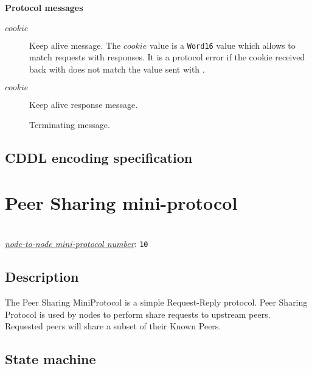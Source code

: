 \paragraph{Protocol messages}
\begin{description}
\item [\MsgKeepAlive{} $cookie$]
  Keep alive message.  The $cookie$ value is a \texttt{Word16} value which allows to
  match requests with responses.  It is a protocol error if the cookie received
  back with \MsgKeepAliveResponse{} does not match the value sent with
  \MsgKeepAlive{}.
\item [\MsgKeepAliveResponse{} $cookie$]
  Keep alive response message.
\item [\MsgDone]
  Terminating message.
\end{description}

\subsection{CDDL encoding specification}


\section{Peer Sharing mini-protocol}
\\
\hyperref[table:node-to-node-protocol-numbers]{\textit{node-to-node mini-protocol number}}: \texttt{10}\\
\label{peer-sharing-protocol}
\subsection{Description}
The Peer Sharing MiniProtocol is a simple Request-Reply protocol. Peer Sharing
Protocol is used by nodes to perform share requests to upstream peers. Requested peers
will share a subset of their Known Peers.

\newcommand{\PsClient}{\state{StIdle}}
\newcommand{\PsServer}{\state{StBusy}}
\newcommand{\MsgShareRequest}{\trans{MsgShareRequest}}
\newcommand{\MsgSharePeers}{\trans{MsgSharePeers}}
\subsection{State machine}

